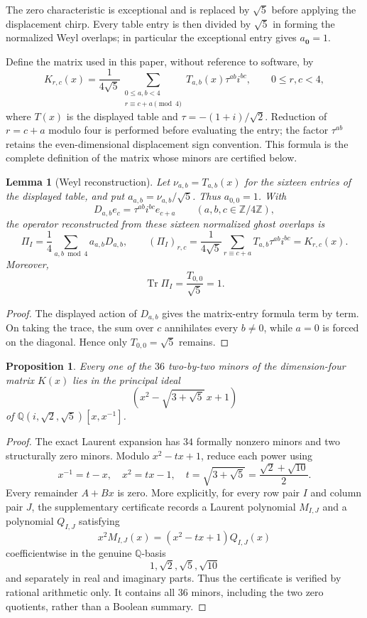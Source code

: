 \documentclass[11pt]{article}
\newtheorem{proposition}[theorem]{Proposition}
\newtheorem{lemma}[theorem]{Lemma}
\newcommand{\Tr}{\operatorname{Tr}}
\newcommand{\Q}{\mathbb Q}
\begin{document}
The zero characteristic is exceptional and is replaced by $\sqrt5$
before applying the displacement chirp.  Every table entry is then
divided by $\sqrt5$ in forming the normalized Weyl overlaps; in
particular the exceptional entry gives $a_{\boldsymbol0}=1$.

Define the matrix used in this paper, without reference to software, by
\[
 K_{r,c}(x)=\frac1{4\sqrt5}
 \sum_{\substack{0\le a,b<4\\r\equiv c+a\pmod4}}
 T_{a,b}(x)\tau^{ab}i^{bc},\qquad 0\le r,c<4,
\]
where $T(x)$ is the displayed table and
$\tau=-(1+i)/\sqrt2$.  Reduction of $r=c+a$ modulo four is performed
before evaluating the entry; the factor $\tau^{ab}$ retains the
even-dimensional displacement sign convention.  This formula is the
complete definition of the matrix whose minors are certified below.

\begin{lemma}[Weyl reconstruction]\label{lem:weyl}
Let $\nu_{a,b}=T_{a,b}(x)$ for the sixteen entries of the displayed
table, and put $a_{a,b}=\nu_{a,b}/\sqrt5$.  Thus
$a_{0,0}=1$.  With
\[
 D_{a,b}e_c=\tau^{ab}i^{bc}e_{c+a}\qquad(a,b,c\in\mathbb Z/4\mathbb Z),
\]
the operator reconstructed from these sixteen normalized ghost
overlaps is
\[
 \Pi_I=\frac14\sum_{a,b\bmod4}a_{a,b}D_{a,b},
 \qquad
 (\Pi_I)_{r,c}=\frac1{4\sqrt5}
 \sum_{r\equiv c+a}T_{a,b}\tau^{ab}i^{bc}=K_{r,c}(x).
\]
Moreover,
\[
 \Tr\Pi_I=\frac{T_{0,0}}{\sqrt5}=1.
\]
\end{lemma}

\begin{proof}
The displayed action of $D_{a,b}$ gives the matrix-entry formula
term by term.  On taking the trace, the sum over $c$ annihilates every
$b\ne0$, while $a=0$ is forced on the diagonal.  Hence only
$T_{0,0}=\sqrt5$ remains.
\end{proof}

\begin{proposition}\label{prop:minors}
Every one of the $36$ two-by-two minors of the dimension-four
matrix $K(x)$ lies in the principal ideal
\[
 \left(x^2-\sqrt{3+\sqrt5}\,x+1\right)
\]
of $\Q(i,\sqrt2,\sqrt5)[x,x^{-1}]$.
\end{proposition}

\begin{proof}
The exact Laurent expansion has $34$ formally nonzero minors and two
structurally zero minors.  Modulo $x^2-tx+1$, reduce each power using
\[
 x^{-1}=t-x,\quad x^2=tx-1,\quad
 t=\sqrt{3+\sqrt5}=\frac{\sqrt2+\sqrt{10}}2.
\]
Every remainder $A+Bx$ is zero.  More explicitly, for every row pair
$I$ and column pair $J$, the supplementary certificate records a
Laurent polynomial $M_{I,J}$ and a polynomial $Q_{I,J}$ satisfying
\[
 x^2M_{I,J}(x)
 =(x^2-tx+1)Q_{I,J}(x)
\]
coefficientwise in the genuine $\Q$-basis
\[
1,\sqrt2,\sqrt5,\sqrt{10}
\]
and separately in real and imaginary parts.  Thus the certificate is
verified by rational arithmetic only.  It contains all $36$ minors,
including the two zero quotients, rather than a Boolean summary.
\end{proof}
\end{document}
